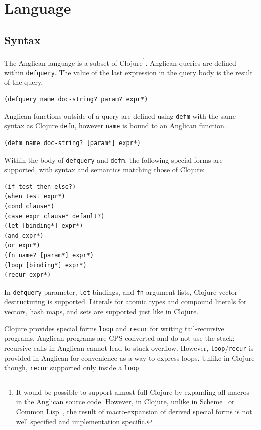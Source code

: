 \documentclass[preprint]{sigplanconf}
\begin{document}
\section{Language}
\label{sec:language}

\subsection{Syntax}

The Anglican language is a subset of Clojure\footnote{It would be
possible to support almost full Clojure by expanding all macros
in the Anglican source code. However, in Clojure, unlike in
Scheme~\cite{SDF+10} or Common Lisp~\cite{PC94}, the result
of macro-expansion of derived special forms is not well
specified and implementation specific.}.  Anglican queries
are defined within \texttt{defquery}. The value of the last
expression in the query body is the result of the query.
\begin{lstlisting}[style=default]
(defquery name doc-string? param? expr*)
\end{lstlisting}
Anglican functions outside of a query are defined using
\texttt{defm} with the same syntax as Clojure \texttt{defn},
however \texttt{name} is bound to an Anglican function.
\begin{lstlisting}[style=default]
(defm name doc-string? [param*] expr*)
\end{lstlisting}
Within the body of \texttt{defquery} and \texttt{defm}, the
following special forms are supported, with syntax and semantics 
matching those of Clojure:
\begin{lstlisting}[style=default]
(if test then else?)
(when test expr*)
(cond clause*)
(case expr clause* default?)
(let [binding*] expr*)
(and expr*)
(or expr*)
(fn name? [param*] expr*)
(loop [binding*] expr*)
(recur expr*)
\end{lstlisting}
In \texttt{defquery} parameter, \texttt{let} bindings, and
\texttt{fn} argument lists, Clojure vector destructuring is
supported. Literals for atomic types and compound literals for
vectors, hash maps, and sets are supported just like in Clojure.

Clojure provides special forms \texttt{loop} and \texttt{recur}
for writing tail-recursive programs.  Anglican programs are
CPS-converted and do not use the stack; recursive calls
in Anglican cannot lead to stack overflow.  However,
\texttt{loop}/\texttt{recur} is provided in Anglican for
convenience as a way to express loops. Unlike in Clojure though,
\texttt{recur} supported only inside a \texttt{loop}.
\end{document}
